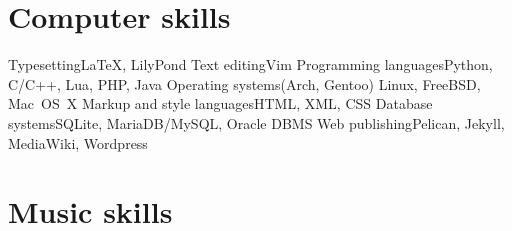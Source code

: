 \section{Computer skills}

\cvdoubleitem
	{Typesetting}{{\texfont\LaTeX}, LilyPond}
	{Text editing}{Vim}
\cvdoubleitem
	{Programming languages}{Python, C/C++, Lua, PHP, Java}
	{Operating systems}{(Arch, Gentoo) Linux, FreeBSD, Mac~OS~X}
\cvdoubleitem
	{Markup and style languages}{HTML, XML, CSS}
	{Database systems}{SQLite, MariaDB/MySQL, Oracle DBMS}
\cvdoubleitem
	{Web publishing}{Pelican, Jekyll, MediaWiki, Wordpress}
	{}{}



\section{Music skills}



